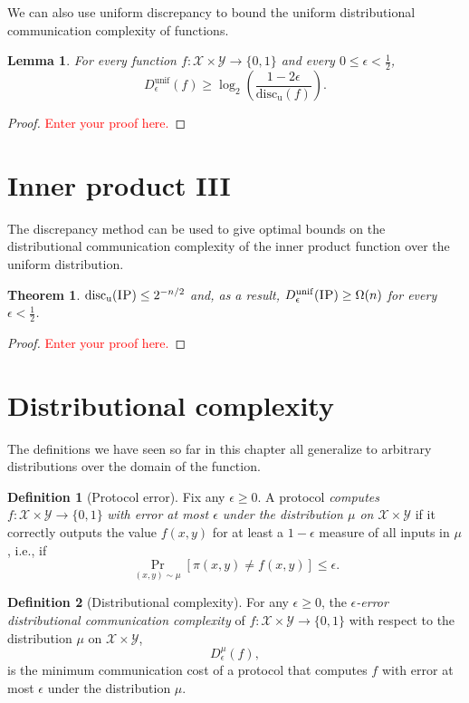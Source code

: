 \documentclass[11pt]{amsart}
\theoremstyle{plain}
\newtheorem{theorem}{Theorem}
\newtheorem{lemma}{Lemma}
\theoremstyle{definition}
\newtheorem{definition}{Definition}
\theoremstyle{plain}
\newcommand{\calX}{\mathcal{X}}
\newcommand{\calY}{\mathcal{Y}}
\newcommand{\discu}{\mathrm{disc_u}}
\newcommand{\IP}{\textsc{IP}}
\newcommand{\replacethistext}[1]{\textcolor{red}{#1}}
\begin{document}
We can also use uniform discrepancy to bound the uniform distributional  communication complexity of functions.

\begin{lemma}
For every function $f : \calX \times \calY \to \{0,1\}$ and every $0 \le \epsilon < \frac12$, 
\[
D_\epsilon^{\mathrm{unif}}(f) \ge \log_2 \left( \frac{1-2\epsilon}{\discu(f)} \right).
\]
\end{lemma}

\begin{proof}
\replacethistext{Enter your proof here.}
\end{proof}


\newpage \section{Inner product III}

The discrepancy method can be used to give optimal bounds on the distributional communication complexity of the inner product function over the uniform distribution.

\begin{theorem}
$\discu(\IP) \le 2^{-n/2}$ and, as a result, $D_\epsilon^{\mathrm{unif}}(\IP) \ge \Omega(n)$ for every $\epsilon < \frac12$.
\end{theorem}

\begin{proof}
\replacethistext{Enter your proof here.}
\end{proof}


\newpage \section{Distributional complexity}

The definitions we have seen so far in this chapter all generalize to arbitrary distributions over the domain of the function.

\begin{definition}[Protocol error]
Fix any $\epsilon \ge 0$. A protocol \emph{computes} $f : \calX \times \calY \to \{0,1\}$ \emph{with error at most $\epsilon$ under the distribution $\mu$ on $\calX \times \calY$} if it correctly outputs the value $f(x,y)$ for at least a $1-\epsilon$ measure of all inputs in $\mu$, i.e., if
\[
\Pr_{(x,y) \sim \mu}[ \pi(x,y) \neq f(x,y) ] \le \epsilon.
\]
\end{definition}

\begin{definition}[Distributional complexity]
For any $\epsilon \ge 0$, the \emph{$\epsilon$-error distributional communication complexity} of $f : \calX \times \calY \to \{0,1\}$ with respect to the distribution $\mu$ on $\calX \times \calY$,
\[
D_\epsilon^{\mu}(f),
\]
is the minimum communication cost of a protocol that computes $f$ with error at most $\epsilon$ under the distribution $\mu$.
\end{definition}
\end{document}
